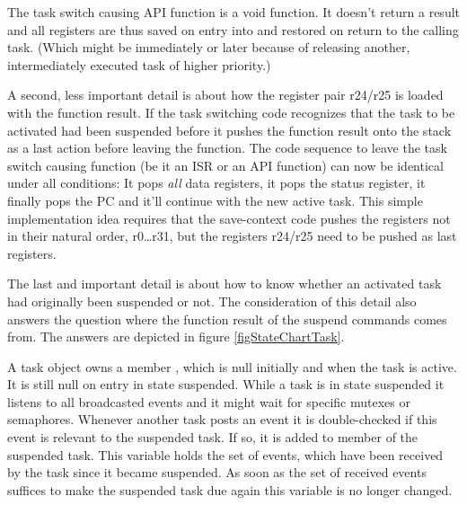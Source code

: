 
The task switch causing API function  is a void
function. It doesn't return a result and all registers are thus saved on
entry into  and restored on return to the calling
task. (Which might be immediately or later because of releasing another,
intermediately executed task of higher priority.)

A second, less important detail is about how the register pair r24/r25 is
loaded with the function result. If the task switching code recognizes
that the task to be activated had been suspended before it pushes the
function result onto the stack as a last action before leaving the
function. The code sequence to leave the task switch causing function (be
it an ISR or an API function) can now be identical under all conditions: It
pops \emph{all} data registers, it pops the status register, it finally
pops the PC and it'll continue with the new active task. This simple
implementation idea requires that the save-context code pushes the
registers not in their natural order, r0\ldots r31, but the registers
r24/r25 need to be pushed as last registers.

The last and important detail is about how to know whether an activated
task had originally been suspended or not. The consideration of this
detail also answers the question where the function result of the suspend
commands comes from. The answers are depicted in figure
\ref{figStateChartTask}.


A task object owns a member , which is null
initially and when the task is active. It is still null on entry in state
suspended. While a task is in state suspended it listens to all
broadcasted events and it might wait for specific mutexes or semaphores.
Whenever another task posts an event it is double-checked if this event is
relevant to the suspended task. If so, it is added to member
 of the suspended task. This variable holds the set
of events, which have been received by the task since it became suspended.
As soon as the set of received events suffices to make the suspended task
due again this variable is no longer changed.

